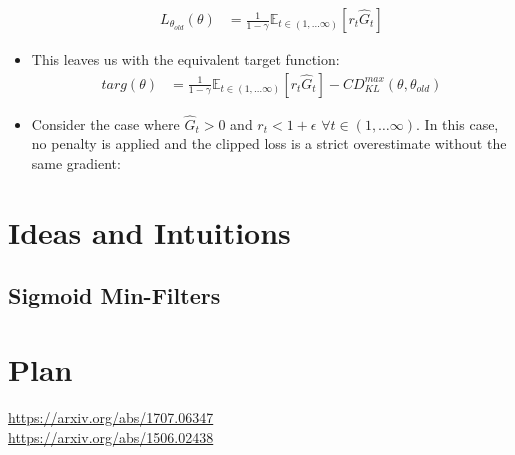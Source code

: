 \documentclass[a4paper]{article}
\begin{document}
\begin{itemize}
\begin{align*}
            L_{\theta_{old}}(\theta) &= \frac{1}{1 - \gamma}
            \mathbb{E}_{t \in (1, \dots \infty)}
            \left[ r_{t} \hat{G}_t \right]
        \end{align*}
    \item This leaves us with the equivalent target function:
    \begin{align*}
        targ(\theta) &= \frac{1}{1 - \gamma}
            \mathbb{E}_{t \in (1, \dots \infty)}
            \left[ r_{t} \hat{G}_t \right] 
        - CD_{KL}^{max}(\theta, \theta_{old})
    \end{align*}
    \item Consider the case where $\hat{G}_t > 0$ and $r_t < 1 + \epsilon$
    $\forall t \in (1, \dots \infty)$. In this case, no penalty is applied and
    the clipped loss is a strict overestimate without the same gradient:
\end{itemize}

\newpage
\section*{Ideas and Intuitions}
\subsection*{Sigmoid Min-Filters}

\newpage
\section*{Plan}

\newpage
\begin{thebibliography}{9}
\url{https://arxiv.org/abs/1707.06347}\\
\url{https://arxiv.org/abs/1506.02438}
\end{thebibliography}
\end{document}
